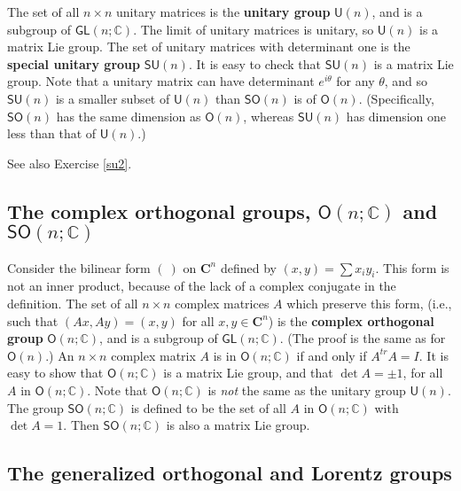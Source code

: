\documentclass{amsbook}
\theoremstyle{plain}
\numberwithin{equation}{chapter}
\numberwithin{theorem}{chapter}
\begin{document}
The set of all $n\times n$ unitary matrices is the \textbf{unitary group}
$\mathsf{U}(n)$, and is a subgroup of $\mathsf{GL}(n;\mathbb{C})$. The limit
of unitary matrices is unitary, so $\mathsf{U}(n)$ is a matrix Lie group. The
set of unitary matrices with determinant one is the \textbf{special unitary
group} $\mathsf{SU}(n)$. It is easy to check that $\mathsf{SU}(n)$ is a matrix
Lie group. Note that a unitary matrix can have determinant $e^{i\theta}$ for
any $\theta$, and so $\mathsf{SU}(n)$ is a smaller subset of $\mathsf{U}(n)$
than $\mathsf{SO}(n)$ is of $\mathsf{O}(n)$. (Specifically, $\mathsf{SO}(n)$
has the same dimension as $\mathsf{O}(n)$, whereas $\mathsf{SU}(n)$ has
dimension one less than that of $\mathsf{U}(n)$.)

See also Exercise \ref{su2}.

\subsection{The complex orthogonal groups, $\mathsf{O}(n;\mathbb{C})$ and
$\mathsf{SO}(n;\mathbb{C})$}

Consider the bilinear form $\left(  \ \right)  $ on $\mathbf{C}^{n}$ defined
by $(x,y)=\sum x_{i}y_{i}$. This form is not an inner product, because of the
lack of a complex conjugate in the definition. The set of all $n\times n$
complex matrices $A$ which preserve this form, (i.e., such that
$(Ax,Ay)=(x,y)$ for all $x,y\in\mathbf{C}^{n}$) is the \textbf{complex
orthogonal group} $\mathsf{O}(n;\mathbb{C})$, and is a subgroup of
$\mathsf{GL}(n;\mathbb{C})$. (The proof is the same as for $\mathsf{O}(n)$.)
An $n\times n$ complex matrix $A$ is in $\mathsf{O}(n;\mathbb{C})$ if and only
if $A^{tr}A=I$. It is easy to show that $\mathsf{O}(n;\mathbb{C})$ is a matrix
Lie group, and that $\det A=\pm1$, for all $A$ in $\mathsf{O}(n;\mathbb{C})$.
Note that $\mathsf{O}(n;\mathbb{C})$ is \textit{not} the same as the unitary
group $\mathsf{U}(n)$. The group $\mathsf{SO}(n;\mathbb{C})$ is defined to be
the set of all $A$ in $\mathsf{O}(n;\mathbb{C})$ with $\det A=1$. Then
$\mathsf{SO}(n;\mathbb{C})$ is also a matrix Lie group.

\subsection{The generalized orthogonal and Lorentz groups}
\end{document}
